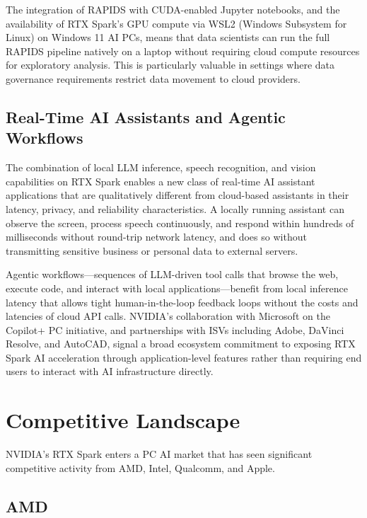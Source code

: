 \documentclass[conference]{IEEEtran}
\begin{document}
The integration of RAPIDS with CUDA-enabled Jupyter notebooks, and the availability of RTX Spark's GPU compute via WSL2 (Windows Subsystem for Linux) on Windows 11 AI PCs, means that data scientists can run the full RAPIDS pipeline natively on a laptop without requiring cloud compute resources for exploratory analysis. This is particularly valuable in settings where data governance requirements restrict data movement to cloud providers.

\subsection{Real-Time AI Assistants and Agentic Workflows}

The combination of local LLM inference, speech recognition, and vision capabilities on RTX Spark enables a new class of real-time AI assistant applications that are qualitatively different from cloud-based assistants in their latency, privacy, and reliability characteristics. A locally running assistant can observe the screen, process speech continuously, and respond within hundreds of milliseconds without round-trip network latency, and does so without transmitting sensitive business or personal data to external servers.

Agentic workflows---sequences of LLM-driven tool calls that browse the web, execute code, and interact with local applications---benefit from local inference latency that allows tight human-in-the-loop feedback loops without the costs and latencies of cloud API calls. NVIDIA's collaboration with Microsoft on the Copilot+ PC initiative, and partnerships with ISVs including Adobe, DaVinci Resolve, and AutoCAD, signal a broad ecosystem commitment to exposing RTX Spark AI acceleration through application-level features rather than requiring end users to interact with AI infrastructure directly.

\section{Competitive Landscape}
\label{sec:competition}

NVIDIA's RTX Spark enters a PC AI market that has seen significant competitive activity from AMD, Intel, Qualcomm, and Apple.

\subsection{AMD}
\end{document}
